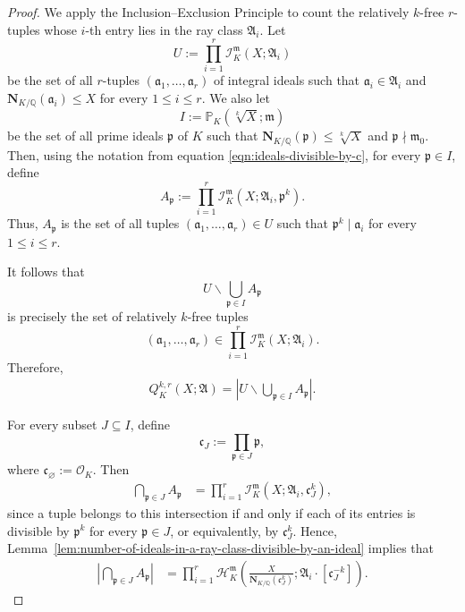 \documentclass[11pt, reqno]{amsart}
\numberwithin{equation}{section}
\newcommand{\Q}{\mathbb{Q}}
\newcommand{\Nrm}[2]{\mathbf{N}_{#1}(#2)}
\theoremstyle{definition}
\begin{document}
\begin{proof}
We apply the Inclusion--Exclusion Principle to count the relatively
$k$-free $r$-tuples whose $i$-th entry lies in the ray class
$\mathfrak{A}_i$. Let
\[
U
:=
\prod_{i=1}^{r}
\mathcal{I}_K^{\mathfrak{m}}(X;\mathfrak{A}_i)
\]
be the set of all $r$-tuples
$(\mathfrak{a}_1,\dots,\mathfrak{a}_r)$ of integral ideals such that
$\mathfrak{a}_i\in\mathfrak{A}_i$ and
$\Nrm{K/\Q}{\mathfrak{a}_i}\leq X$ for every
$1\leq i\leq r$. We also let
\[
I
:=
\mathbb{P}_K(\sqrt[k]{X};\mathfrak{m})
\]
be the set of all prime ideals $\mathfrak{p}$ of $K$ such that
$\Nrm{K/\Q}{\mathfrak{p}}\leq \sqrt[k]{X}$ and
$\mathfrak{p}\nmid\mathfrak{m}_0$. Then, using the notation from equation \eqref{eqn:ideals-divisible-by-c}, for every $\mathfrak{p}\in I$,
define
\[
A_{\mathfrak{p}}
:=
\prod_{i=1}^{r}
\mathcal{I}_K^{\mathfrak{m}}
(X;\mathfrak{A}_i,\mathfrak{p}^k).
\]
Thus, $A_{\mathfrak{p}}$ is the set of all tuples
$(\mathfrak{a}_1,\dots,\mathfrak{a}_r)\in U$ such that
$\mathfrak{p}^k\mid\mathfrak{a}_i$ for every $1\leq i\leq r$.

It follows that
\[
U\smallsetminus\bigcup_{\mathfrak{p}\in I}A_{\mathfrak{p}}
\]
is precisely the set of relatively $k$-free tuples
\[
(\mathfrak{a}_1,\dots,\mathfrak{a}_r)
\in
\prod_{i=1}^{r}
\mathcal{I}_K^{\mathfrak{m}}(X;\mathfrak{A}_i).
\]
Therefore,
\begin{align}\label{eqn:Q-tuples-complement-formula}
Q_K^{k,r}(X;\boldsymbol{\mathfrak{A}})
=
\left|
U\smallsetminus
\bigcup_{\mathfrak{p}\in I}A_{\mathfrak{p}}
\right|.
\end{align}

For every subset $J\subseteq I$, define
\[
\mathfrak{c}_J
:=
\prod_{\mathfrak{p}\in J}\mathfrak{p},
\]
where $\mathfrak{c}_{\varnothing}:=\mathcal{O}_K$. Then
\begin{align*}
\bigcap_{\mathfrak{p}\in J}A_{\mathfrak{p}}
&=
\prod_{i=1}^{r}
\mathcal{I}_K^{\mathfrak{m}}
(X;\mathfrak{A}_i,\mathfrak{c}_J^k),
\end{align*}
since a tuple belongs to this intersection if and only if each of its
entries is divisible by $\mathfrak{p}^k$ for every $\mathfrak{p}\in J$,
or equivalently, by $\mathfrak{c}_J^k$. Hence,
Lemma~\ref{lem:number-of-ideals-in-a-ray-class-divisible-by-an-ideal}
implies that
\begin{align}\label{eqn:intersection-Ap-size}
\left|
\bigcap_{\mathfrak{p}\in J}A_{\mathfrak{p}}
\right|
&=
\prod_{i=1}^{r}
\mathcal{H}_K^{\mathfrak{m}}
\left(
\frac{X}{\Nrm{K/\Q}{\mathfrak{c}_J^k}};
\mathfrak{A}_i\cdot[\mathfrak{c}_J^{-k}]
\right).
\end{align}


\end{proof}
\end{document}
